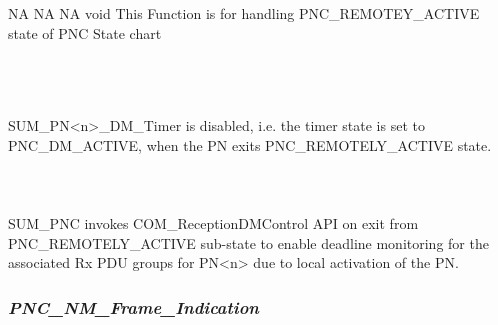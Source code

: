 {NA}
{NA}
{NA}
{void}
{This Function is for handling PNC_REMOTEY_ACTIVE state of PNC State chart}

{ }
\\
\\
\\
SUM_PN<n>_DM_Timer is disabled, i.e. the timer state is set to PNC_DM_ACTIVE, when the PN exits PNC_REMOTELY_ACTIVE state.
\\
{}
\\
\\
\\
SUM_PNC invokes COM_ReceptionDMControl API on exit from PNC_REMOTELY_ACTIVE sub-state to enable deadline monitoring for the associated Rx PDU groups for PN<n> due to local activation of the PN.
\\
{ }


\subsubsection{\textit{PNC_NM_Frame_Indication}}

